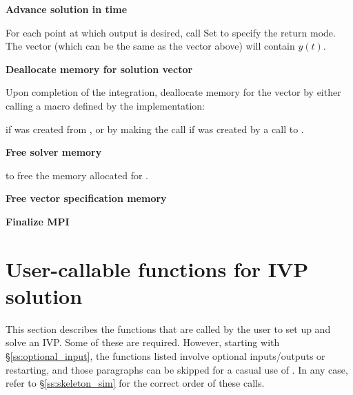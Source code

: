 \begin{Steps}
\item
  {\bf Advance solution in time}

  For each point at which output is desired, call
  Set  to specify the return mode.
  The vector  (which can be the same as
  the vector  above) will contain $y(t)$.
  
\item
  {\bf Deallocate memory for solution vector}

  Upon completion of the integration, deallocate memory for the vector 
  by either calling a macro defined by the {\nvector} implementation:

  {\s} 

  {\p} 

  if  was created from , or by making the call 
   if  was created by a call to .
  
\item
  {\bf Free solver memory}

   to free the memory allocated for {\cvodes}.
  
\item
  {\bf Free vector specification memory}

  {\s} 

  {\p} 

\item 
  {\bf {\p} Finalize MPI}
  
\end{Steps}

\section{User-callable functions for IVP solution}
\label{ss:cvodes_fct_sim}

This section describes the {\cvodes} functions that are called by the user to set up 
and solve an IVP. Some of these are required. However, starting with \S\ref{ss:optional_input},
the functions listed involve optional inputs/outputs or restarting, and those paragraphs can 
be skipped for a casual use of {\cvodes}. In any case, refer to \S\ref{ss:skeleton_sim} for
the correct order of these calls.

